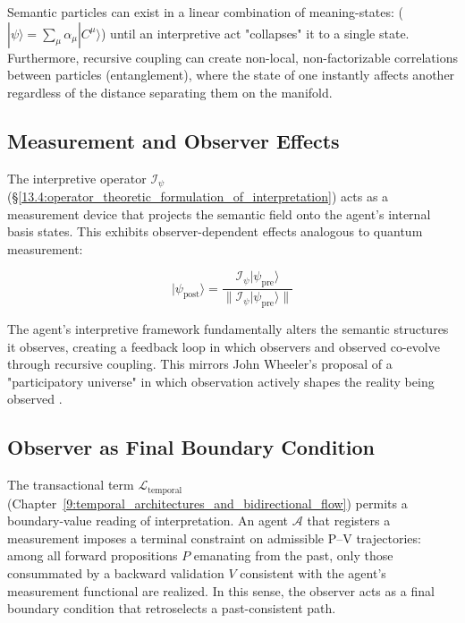 Semantic particles can exist in a linear combination of meaning-states: (\(|\psi\rangle = \sum_\mu \alpha_\mu |C^\mu\rangle\)) until an interpretive act "collapses" it to a single state. Furthermore, recursive coupling can create non-local, non-factorizable correlations between particles (entanglement), where the state of one instantly affects another regardless of the distance separating them on the manifold.


\subsection{Measurement and Observer Effects}
\label{13.7.3:measurement_and_observer_effects}

The interpretive operator \(\mathcal{I}_{\psi}\) (\S\ref{13.4:operator_theoretic_formulation_of_interpretation}) acts as a measurement device that projects the semantic field onto the agent's internal basis states. This exhibits observer-dependent effects analogous to quantum measurement:

\begin{equation}
|\psi_{\text{post}}\rangle = \frac{\mathcal{I}_{\psi}|\psi_{\text{pre}}\rangle}{\|\mathcal{I}_{\psi}|\psi_{\text{pre}}\rangle\|}
\end{equation}

The agent's interpretive framework fundamentally alters the semantic structures it observes, creating a feedback loop in which observers and observed co-evolve through recursive coupling. This mirrors John Wheeler's proposal of a "participatory universe" in which observation actively shapes the reality being observed \autocite{Wheeler1990}.


\subsection{Observer as Final Boundary Condition}
\label{13.7.4:observer_as_final_boundary_condition}

The transactional term \(\mathcal{L}_{\text{temporal}}\) (Chapter~\ref{9:temporal_architectures_and_bidirectional_flow}) permits a boundary-value reading of interpretation. An agent \(\mathcal{A}\) that registers a measurement imposes a terminal constraint on admissible P–V trajectories: among all forward propositions \(P\) emanating from the past, only those consummated by a backward validation \(V\) consistent with the agent's measurement functional are realized. In this sense, the observer acts as a final boundary condition that retroselects a past-consistent path.

